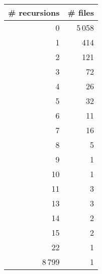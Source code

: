 \begin{tabular}{|r|r|}
\hline
\bf \# recursions&\bf \# files\\
\hline
0&5\,058\\
\hline
1&414\\
\hline
2&121\\
\hline
3&72\\
\hline
4&26\\
\hline
5&32\\
\hline
6&11\\
\hline
7&16\\
\hline
8&5\\
\hline
9&1\\
\hline
10&1\\
\hline
11&3\\
\hline
13&3\\
\hline
14&2\\
\hline
15&2\\
\hline
22&1\\
\hline
8\,799&1\\
\hline
\end{tabular}
